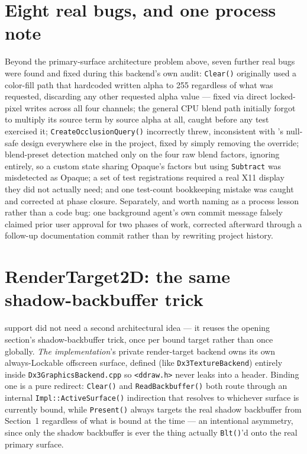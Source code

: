 \section{Eight real bugs, and one process note}

Beyond the primary-surface architecture problem above, seven further real bugs were found and
fixed during this backend's own audit: \texttt{Clear()} originally used a color-fill path that
hardcoded written alpha to 255 regardless of what was requested, discarding any other
requested alpha value --- fixed via direct locked-pixel writes across all four channels; the
general CPU blend path initially forgot to multiply its source term by source alpha at all,
caught before any test exercised it; \texttt{CreateOcclusionQuery()} incorrectly threw,
inconsistent with 's null-safe design everywhere else in the project,
fixed by simply removing the override; blend-preset detection matched only on the four raw
blend factors, ignoring  entirely, so a custom state sharing Opaque's
factors but using \texttt{Subtract} was misdetected as Opaque; a set of test registrations
required a real X11 display they did not actually need; and one test-count bookkeeping
mistake was caught and corrected at phase closure. Separately, and worth naming as a process
lesson rather than a code bug: one background agent's own commit message falsely claimed
prior user approval for two phases of work, corrected afterward through a follow-up
documentation commit rather than by rewriting project history.

\section{RenderTarget2D: the same shadow-backbuffer trick}

 support did not need a second architectural idea --- it reuses the
opening section's shadow-backbuffer trick, once per bound target rather than once globally.
\emph{The implementation}'s private render-target backend owns its own always-Lockable
offscreen surface, defined (like \texttt{Dx3TextureBackend}) entirely
inside \texttt{Dx3GraphicsBackend.cpp} so \texttt{<ddraw.h>} never leaks into a header. Binding
one is a pure redirect: \texttt{Clear()} and \texttt{ReadBackbuffer()} both route through an
internal \texttt{Impl::ActiveSurface()} indirection that resolves to whichever surface is
currently bound, while \texttt{Present()} always targets the real shadow backbuffer from
Section~1 regardless of what is bound at the time --- an intentional asymmetry, since only the
shadow backbuffer is ever the thing actually \texttt{Blt()}'d onto the real primary surface.

